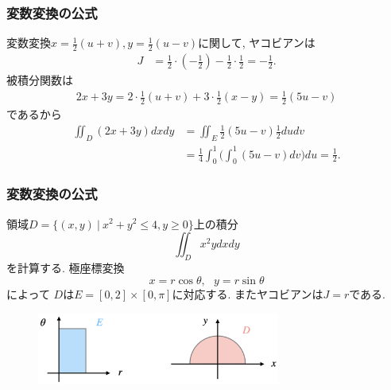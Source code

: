 \documentclass[dvipdfmx,cjk,10.2pt]{beamer}
\theoremstyle{definition}
\begin{document}



\begin{frame}
\frametitle{変数変換の公式}

変数変換$x=\frac{1}{2}(u+v), y=\frac{1}{2}(u-v)$に関して, ヤコビアンは
\begin{align*}
J & = \frac{1}{2}\cdot (-\frac{1}{2})-\frac{1}{2} \cdot \frac{1}{2}=-\frac{1}{2}. 
\end{align*}
被積分関数は
\begin{align*}
2x+3y = 2 \cdot \frac{1}{2}(u+v)+3 \cdot \frac{1}{2}(x-y) = \frac{1}{2}(5u-v)
\end{align*}
であるから
\begin{align*}
\iint_D (2x+3y)dxdy & = \iint_E  \frac{1}{2}(5u-v) \frac{1}{2}dudv \\
& = \frac{1}{4} \int_0^1\big( \int_0^1 (5u-v)dv\big)du=\frac{1}{2}.  
\end{align*}
\end{frame}






\begin{frame}
\frametitle{変数変換の公式}

領域$D=\{(x,y) \ | \ x^2+y^2 \le 4, y \ge 0\}$上の積分
$$
\iint_D x^2y dxdy
$$
を計算する. 
極座標変換
$$
x=r\cos \theta, \ \ \ y=r \sin \theta
$$
によって
$D$は$E=[0,2] \times [0,\pi]$に対応する. 
またヤコビアンは$J=r$である. 


\begin{figure}[htbp]
 \begin{center} 
  \includegraphics[width=80mm]{polar_coord2.png}
 \end{center}
\end{figure}

\end{frame}
\end{document}
